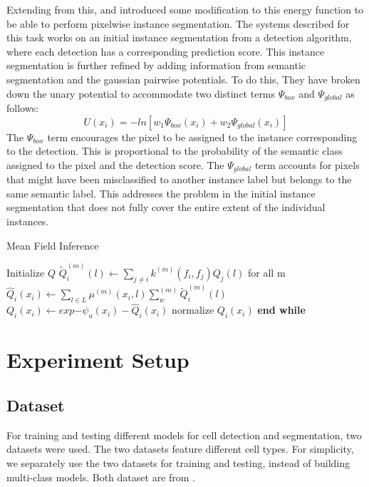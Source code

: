 \documentclass[journal]{IEEEtran}
\begin{document}
Extending from this, \cite{Arnab2017PixelwiseIS} and \cite{Li_2018_ECCV} introduced some modification to this energy function to be able to perform  pixelwise instance segmentation. The systems described for this task works on an initial instance segmentation from a detection algorithm, where each detection has a corresponding prediction score. This instance segmentation is further refined by adding information from semantic segmentation and the gaussian pairwise potentials. To do this, They have broken down the unary potential to accommodate two distinct terms $\Psi_{box}$ and $\Psi_{global}$ as follows:
\begin{equation}
U(x_i) = -ln[w_1\Psi_{box}(x_i) + w_2\Psi_{global}(x_i)]
\end{equation}
The $\Psi_{box}$ term encourages the pixel to be assigned to the instance corresponding to the detection. This is proportional to the probability of the semantic class assigned to the pixel and the detection score. The $\Psi_{global}$ term accounts for pixels that might have been misclassified to another instance label but belongs to the same semantic label. This addresses the problem in the initial instance segmentation that does not fully cover the entire extent of the individual instances.
\begin{algorithm*}
\caption{Mean Field Inference}\label{alg:meanfieldinference}
\begin{algorithmic}[1]
\State Initialize $Q$
\State $\widetilde{Q}_i^{(m)}(l)\gets \sum_{j\neq i}k^{(m)}(f_i,f_j)Q_j(l)$ for all m
\State $\hat{Q}_i(x_i)\gets \sum_{l \in L} \mu^{(m)}(x_i,l)\sum_w^{(m)}\widetilde{Q}_i^{(m)}(l)$
\State $Q_i(x_i)\gets exp{-\psi_u(x_i) - \hat{Q}_i(x_i)}$
\State normalize $Q_i(x_i)$
\EndWhile
\State \textbf{end while}
\end{algorithmic}
\end{algorithm*}

\section{Experiment Setup}
\subsection{Dataset}
For training and testing different models for cell detection and segmentation, two datasets were used. The two datasets feature different cell types. For simplicity, we separately use the two datasets for training and testing, instead of building multi-class models. Both dataset are from \cite{waithe_dominic_2019_2632769}.
\end{document}
